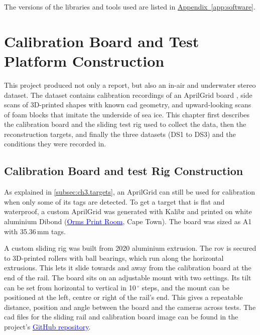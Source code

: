 The versions of the libraries and tools used are listed in \hyperref[app:software]{Appendix~\ref*{app:software}}.

\section{Calibration Board and Test Platform Construction}
\label{sec:testplatform}

This project produced not only a report, but also an in-air and underwater
stereo dataset. The dataset contains calibration recordings of an AprilGrid
board \cite{furgaleUnifiedTemporalSpatial2013}, side scans of 3D-printed shapes with known \gls{cad} geometry, and
upward-looking scans of foam blocks that imitate the underside of sea ice.
This chapter first describes the calibration board and the sliding test rig used
to collect the data, then the reconstruction targets, and finally the three
datasets (DS1 to DS3) and the conditions they were recorded in.
\subsection{Calibration Board and test Rig Construction}


As explained in \autoref{subsec:ch3.targets}, an AprilGrid can still be used for
calibration when only some of its tags are detected. To get a target that is flat and
waterproof, a custom AprilGrid was generated with Kalibr
\cite{furgaleUnifiedTemporalSpatial2013, kalibrRepo} and printed on white aluminium
Dibond (\href{https://www.ormsprintroom.co.za/product/metal-prints/}{\textcolor{blue}{Orms Print Room}}, Cape Town). The board was sized as A1 with 35.36\,mm
tags.

A custom sliding rig was built from 2020 aluminium extrusion. The \gls{rov} is
secured to 3D-printed rollers with ball bearings, which run along the
horizontal extrusions. This lets it slide towards and away from the calibration
board at the end of the rail. The board sits on an adjustable mount with two settings.
Its tilt can be set from horizontal to vertical in 10\,$^\circ$ steps, and the mount can be
positioned at the left, centre or right of the rail's end. This gives a repeatable distance, position
and angle between the board and the cameras across tests. The \gls{cad} files
for the sliding rail and calibration board image can be found in the project's
\href{https://github.com/GlenOJones/UCT_Final_Year_Project/tree/main/CAD}{\textcolor{blue}{GitHub repository}}.

